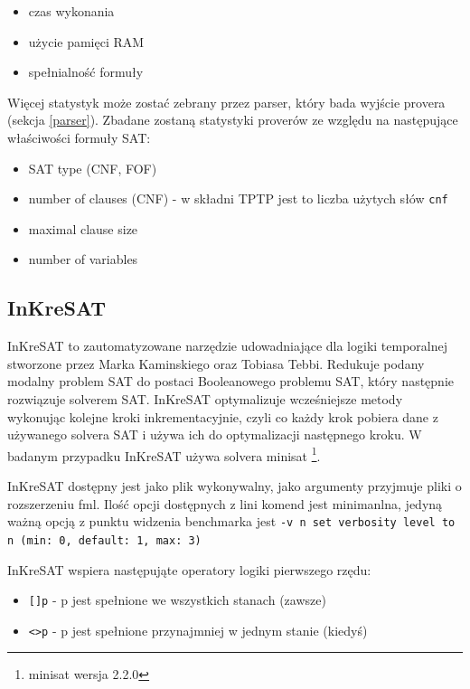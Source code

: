 \documentclass[a4paper,12pt]{article}
\begin{document}
\begin{itemize}
  \item czas wykonania
  \item użycie pamięci RAM
  \item spełnialność formuły
\end{itemize}

\noindent
Więcej statystyk może zostać zebrany przez parser, który bada wyjście provera (sekcja \ref{parser}).
\newline
Zbadane zostaną statystyki proverów ze względu na następujące właściwości formuły SAT:

\begin{itemize}
  \item SAT type (CNF, FOF)
  \item number of clauses (CNF) - w składni TPTP jest to liczba użytych słów \texttt{cnf}
  \item maximal clause size
  \item number of variables
\end{itemize}


\newpage
\subsection{InKreSAT}

InKreSAT to zautomatyzowane narzędzie udowadniające dla logiki temporalnej stworzone przez Marka Kaminskiego oraz Tobiasa Tebbi. Redukuje podany modalny problem SAT do postaci Booleanowego problemu SAT, który następnie rozwiązuje solverem SAT. InKreSAT optymalizuje wcześniejsze metody wykonując kolejne kroki inkrementacyjnie, czyli co każdy krok pobiera dane z używanego solvera SAT i używa ich do optymalizacji następnego kroku. W badanym przypadku InKreSAT używa solvera  minisat \footnote{minisat wersja 2.2.0}.

InKreSAT dostępny jest jako plik wykonywalny, jako argumenty przyjmuje pliki o rozszerzeniu fml. Ilość opcji dostępnych z lini komend jest minimanlna, jedyną ważną opcją z punktu widzenia benchmarka jest \texttt{-v n  set verbosity level to n (min: 0, default: 1, max: 3)}

InKreSAT wspiera następująte operatory logiki pierwszego rzędu:
\begin{itemize}
  \item \texttt{[]p} - p jest spełnione we wszystkich stanach (zawsze)
  \item \texttt{<>p} - p jest spełnione przynajmniej w jednym stanie (kiedyś)
\end{itemize}
\end{document}
